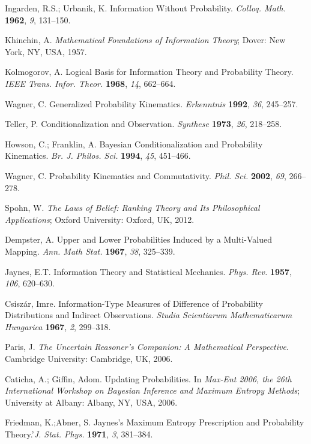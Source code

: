 \documentclass[entropy,article,accept,oneauthor,pdftex,12pt,a4paper]{mdpi}
\begin{document}
\begin{thebibliography}{----}
 Ingarden, R.S.; Urbanik, K.  Information Without Probability. \emph{Colloq. Math.} {\bf1962}, \emph{9}, 131--150.

 Khinchin, A. \emph{Mathematical Foundations of Information Theory}; Dover: New York, NY, USA, 1957.

 Kolmogorov, A. Logical Basis for Information Theory and Probability Theory. \emph{IEEE Trans.  Infor. Theor.} {\bf1968}, \emph{14},  662--664.

 Wagner, C. Generalized Probability Kinematics. \emph{Erkenntnis} {\bf1992}, \emph{36}, 245--257.

 Teller, P. Conditionalization and Observation. \emph{Synthese} {\bf1973}, \emph{26}, 218--258.

 Howson, C.; Franklin, A. Bayesian Conditionalization and Probability Kinematics. \emph{Br. J. Philos. Sci.} {\bf1994}, \emph{45},  451--466.

Wagner, C. Probability Kinematics and Commutativity. \emph{Phil. Sci.}  {\bf2002}, \emph{69}, 266--278.

 Spohn, W. \emph{The Laws of Belief: Ranking Theory and Its Philosophical Applications}; Oxford University: Oxford, UK, 2012.

 Dempster, A. Upper and Lower Probabilities Induced by a Multi-Valued Mapping. \emph{Ann. Math Stat.} {\bf1967}, \emph{38}, 325--339.

 Jaynes, E.T. Information Theory and Statistical Mechanics. \emph{Phys. Rev.} {\bf1957}, \emph{106}, 620--630.

 Csisz{\'a}r, Imre. Information-Type Measures of Difference of Probability Distributions and Indirect Observations. \emph{Studia Scientiarum Mathematicarum Hungarica} {\bf 1967}, \emph{2}, 299--318.

 Paris, J. \emph{The Uncertain Reasoner's Companion: A Mathematical Perspective}.  Cambridge University: Cambridge, UK, 2006.

 Caticha, A.; Giffin, Adom. Updating Probabilities. In \emph{Max-Ent 2006, the 26th International Workshop on Bayesian Inference and Maximum Entropy Methods}; University at Albany: Albany, NY, USA, 2006.

Friedman, K.;Abner, S. Jaynes's Maximum Entropy Prescription and Probability Theory.'\emph{J. Stat. Phys.} {\bf1971}, \emph{3}, 381--384.


\end{thebibliography}
\end{document}
